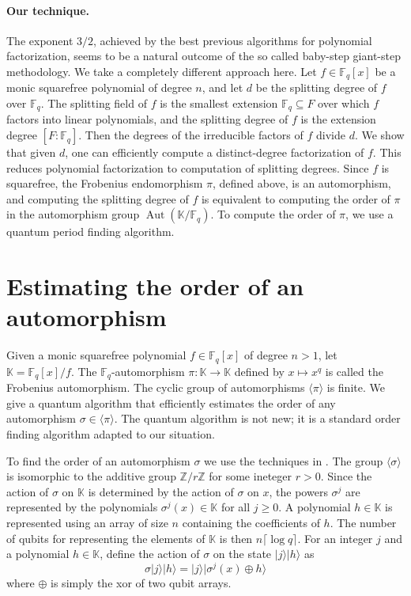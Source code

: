\documentclass[11pt]{article}
\theoremstyle{plain}
\theoremstyle{definition}
\newcommand{\lrang}[1]{\langle#1\rangle}
\newcommand{\ldbrac}[1]{\lvert#1\rangle}
\DeclareMathOperator{\Aut}{Aut}
\def\K{\ensuremath{\mathbb{K}}}
\def\Z{\ensuremath{\mathbb{Z}}}
\def\F{\ensuremath{\mathbb{F}}}
\begin{document}
\paragraph{Our technique.}
The exponent $3/2$, achieved by the best previous algorithms for polynomial factorization, seems to 
be a natural outcome of the so called baby-step giant-step methodology. We take a completely 
different approach here. Let $f \in \F_q[x]$ be a monic squarefree polynomial of degree $n$, and let 
$d$ be the splitting degree of $f$ over $\F_q$. The splitting field of $f$ is the smallest extension 
$\F_q \subseteq F$ over which $f$ factors into linear polynomials, and the splitting degree of $f$ 
is the extension degree $[F : \F_q]$. Then the degrees of the irreducible factors of $f$ divide $d$. 
We show that given $d$, one can efficiently compute a distinct-degree factorization of $f$. This 
reduces polynomial factorization to computation of splitting degrees. Since $f$ is squarefree, the 
Frobenius endomorphism $\pi$, defined above, is an automorphism, and computing the splitting degree 
of $f$ is equivalent to computing the order of $\pi$ in the automorphism group $\Aut(\K / \F_q)$. To 
compute the order of $\pi$, we use a quantum period finding algorithm. 





\section{Estimating the order of an automorphism}
\label{sec:ord-frob}

Given a monic squarefree polynomial $f \in \F_q[x]$ of degree $n > 1$, let $\K = \F_q[x] / f$. The 
$\F_q$-automorphism $\pi: \K \rightarrow \K$ defined by $x \mapsto x^q$ is called the Frobenius 
automorphism. The cyclic group of automorphisms $\lrang{\pi}$ is finite. We give a quantum algorithm 
that efficiently estimates the order of any automorphism $\sigma \in \lrang{\pi}$. The quantum 
algorithm is not new; it is a standard order finding algorithm adapted to our situation. 

To find the order of an automorphism $\sigma$ we use the techniques in \cite{kaye2007introduction, 
nielsen2010quantum}. The group $\lrang{\sigma}$ is isomorphic to the additive group $\Z/r\Z$ for 
some ineteger $r > 0$. Since the action of $\sigma$ on $\K$ is determined by the action of $\sigma$ 
on $x$, the powers $\sigma^j$ are represented by the polynomials $\sigma^j(x) \in \K$ for all $j 
\ge 0$. A polynomial $h \in \K$ is represented using an array of size $n$ containing the 
coefficients of $h$. The number of qubits for representing the elements of $\K$ is then $n\lceil 
\log q \rceil$. For an integer $j$ and a polynomial $h \in \K$, define the action of $\sigma$ on the 
state $\ldbrac{j} \ldbrac{h}$ as
\begin{equation}
	\label{equ:sig-act}
	\sigma \ldbrac{j}\ldbrac{h} = \ldbrac{j}\ldbrac{\sigma^j(x) \oplus h}
\end{equation}
where $\oplus$ is simply the xor of two qubit arrays.
\end{document}
